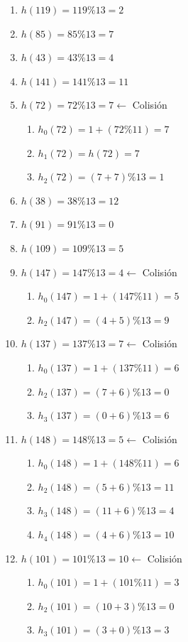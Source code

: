 \documentclass[10pt,a4paper,spanish]{report}
\begin{document}
\begin{minipage}{0.6\textwidth}
\begin{enumerate}
      \item $h(119) = 119 \% 13 = 2$
      \item $h(85) = 85 \% 13 = 7$
      \item $h(43) = 43 \% 13 = 4$
      \item $h(141) = 141 \% 13 = 11$
      \item $h(72) = 72 \% 13 = 7 \longleftarrow$ Colisión
      \begin{enumerate}[$\diamond$]
            \item $h_0 (72) = 1 + (72 \% 11) = 7$
            \item $h_1 (72) = h(72) = 7$
            \item $h_2 (72) = (7+7) \% 13 = 1$
      \end{enumerate}
      \item $h(38) = 38 \% 13 = 12$
      \item $h(91) = 91 \% 13 = 0$
      \item $h(109) = 109 \% 13 = 5$
      \item $h(147) = 147 \% 13 = 4 \longleftarrow$ Colisión
      \begin{enumerate}[$\diamond$]
            \item $h_0 (147) = 1 + (147 \% 11) = 5$
            \item $h_2 (147) = (4+5) \% 13 = 9$
      \end{enumerate}
      \item $h(137) = 137 \% 13 = 7 \longleftarrow$ Colisión
      \begin{enumerate}
            \item $h_0 (137) = 1 + (137 \% 11) = 6$
            \item $h_2 (137) = (7+6) \% 13 = 0$
            \item $h_3 (137) = (0+6) \% 13 = 6$
      \end{enumerate}
      \item $h(148) = 148 \% 13 = 5 \longleftarrow$ Colisión
      \begin{enumerate}[$\diamond$]
            \item $h_0 (148) = 1 + (148 \% 11) = 6$
            \item $h_2 (148) = (5+6) \% 13 = 11$
            \item $h_3 (148) = (11+6) \% 13 = 4$
            \item $h_4 (148) = (4+6) \% 13 = 10$
      \end{enumerate}
      \item $h(101) = 101 \% 13 = 10 \longleftarrow$ Colisión
      \begin{enumerate}[$\diamond$]
            \item $h_0 (101) = 1 + (101 \% 11) = 3$
            \item $h_2 (101) = (10+3) \% 13 = 0$
            \item $h_3 (101) = (3+0) \% 13 = 3$
      \end{enumerate}
\end{enumerate}
\end{minipage}
\end{document}
